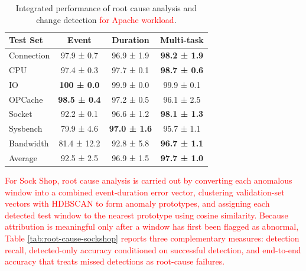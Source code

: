 \documentclass[preprint,12pt]{elsarticle}
\begin{document}
\begin{table}[tb]
\centering
\caption{Integrated performance of root cause analysis and change detection \textcolor{red}{for Apache workload}.}
\label{tab:root-cause}
\begin{adjustbox}{center, width=0.8\textwidth}
\begin{tabular}{|l|c|c|c|}
\hline
Test Set & Event & Duration & Multi-task \\ \hline
Connection        & 97.9 ± 0.7 & 96.9 ± 1.9 & \textbf{98.2 ± 1.9} \\
CPU               & 97.4 ± 0.3 & 97.7 ± 0.1 & \textbf{98.7 ± 0.6} \\
IO                & \textbf{100 ± 0.0}   & 99.9 ± 0.0 & 99.9 ± 0.1 \\
OPCache           & \textbf{98.5 ± 0.4}  & 97.2 ± 0.5 & 96.1 ± 2.5 \\
Socket            & 92.2 ± 0.1 & 96.6 ± 1.2 & \textbf{98.1 ± 1.3} \\
Sysbench          & 79.9 ± 4.6 & \textbf{97.0 ± 1.6} & 95.7 ± 1.1 \\
Bandwidth         & 81.4 ± 12.2& 92.8 ± 5.8 & \textbf{96.7 ± 1.1} \\ \hline
Average           & 92.5 ± 2.5  & 96.9 ± 1.5 & \textbf{97.7 ± 1.0} \\ \hline
\end{tabular}
\end{adjustbox}
\end{table}

\textcolor{red}{For Sock Shop, root cause analysis is carried out by converting each anomalous window into a combined event-duration error vector, clustering validation-set vectors with HDBSCAN to form anomaly prototypes, and assigning each detected test window to the nearest prototype using cosine similarity. Because attribution is meaningful only after a window has first been flagged as abnormal, Table \ref{tab:root-cause-sockshop} reports three complementary measures: detection recall, detected-only accuracy conditioned on successful detection, and end-to-end accuracy that treats missed detections as root-cause failures.}

\begin{table}[tb]
\centering
\caption{\textcolor{red}{Sock Shop root cause analysis performance using 5-category multi-task models and HDBSCAN prototypes. The last four columns report end-to-end accuracy for each anomaly family.}}
\label{tab:root-cause-sockshop}
{\color{red}
\setlength{\tabcolsep}{5pt}
\renewcommand{\arraystretch}{1.1}
}
\end{table}
\end{document}
